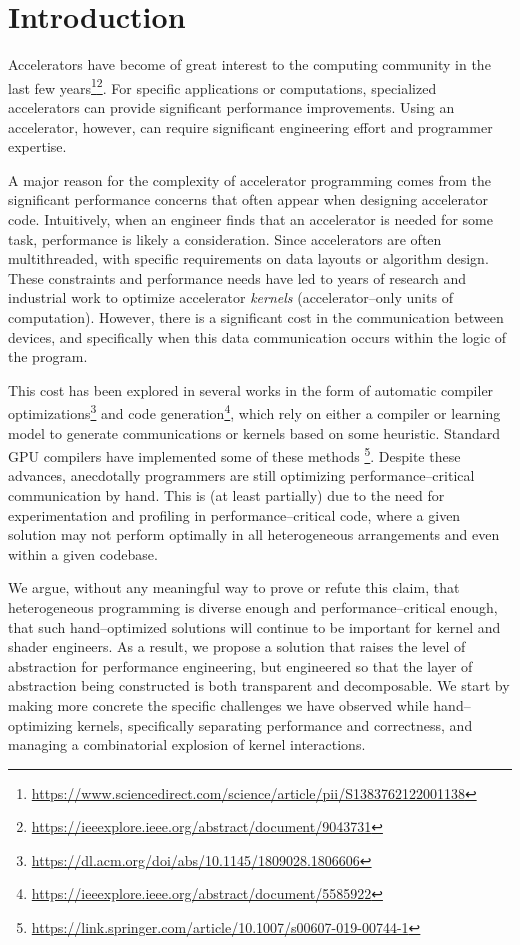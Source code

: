 \section{Introduction}
\label{sec:caimanintro}

Accelerators have become of great interest to the computing community in the last few years\footnote{\url{https://www.sciencedirect.com/science/article/pii/S1383762122001138}}\footnote{\url{https://ieeexplore.ieee.org/abstract/document/9043731}}.  For specific applications or computations, specialized accelerators can provide significant performance improvements.  Using an accelerator, however, can require significant engineering effort and programmer expertise.

A major reason for the complexity of accelerator programming comes from the significant performance concerns that often appear when designing accelerator code.  Intuitively, when an engineer finds that an accelerator is needed for some task, performance is likely a consideration.  Since accelerators are often multithreaded, with specific requirements on data layouts or algorithm design.  These constraints and performance needs have led to years of research and industrial work to optimize accelerator \emph{kernels} (accelerator--only units of computation).  However, there is a significant cost in the communication between devices, and specifically when this data communication occurs within the logic of the program.

This cost has been explored in several works in the form of automatic compiler optimizations\footnote{\url{https://dl.acm.org/doi/abs/10.1145/1809028.1806606}} and code generation\footnote{\url{https://ieeexplore.ieee.org/abstract/document/5585922}}, which rely on either a compiler or learning model to generate communications or kernels based on some heuristic.  Standard GPU compilers have implemented some of these methods \footnote{\url{https://link.springer.com/article/10.1007/s00607-019-00744-1}}.  Despite these advances, anecdotally programmers are still optimizing performance--critical communication by hand.  This is (at least partially) due to the need for experimentation and profiling in performance--critical code, where a given solution may not perform optimally in all heterogeneous arrangements and even within a given codebase.

We argue, without any meaningful way to prove or refute this claim, that heterogeneous programming is diverse enough and performance--critical enough, that such hand--optimized solutions will continue to be important for kernel and shader engineers.  As a result, we propose a solution that raises the level of abstraction for performance engineering, but engineered so that the layer of abstraction being constructed is both transparent and decomposable.  We start by making more concrete the specific challenges we have observed while hand--optimizing kernels, specifically separating performance and correctness, and managing a combinatorial explosion of kernel interactions.

